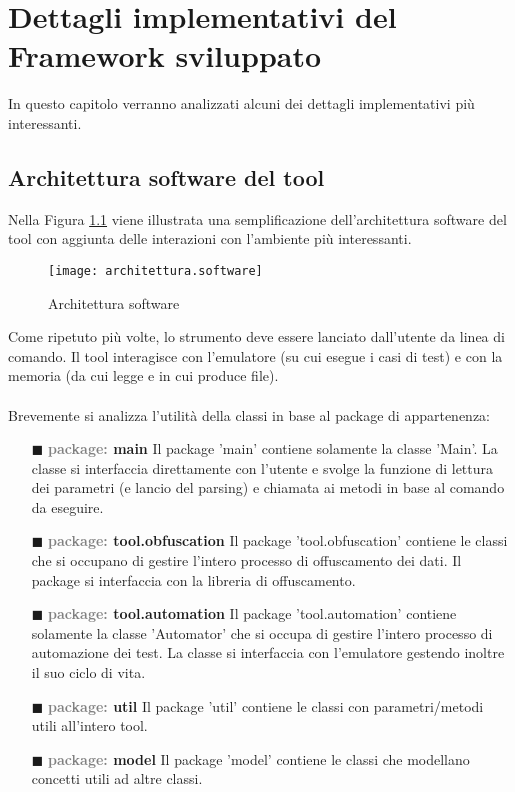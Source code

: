 
\chapter{Dettagli implementativi del Framework sviluppato}
\label{cap:dettagli}
In questo capitolo verranno analizzati alcuni dei dettagli implementativi più interessanti.
\rhead{}
\section{Architettura software del tool}
Nella Figura \ref{fig:arch.soft} viene illustrata una semplificazione dell'architettura software del tool con aggiunta delle interazioni con l'ambiente più interessanti.
\begin{figure}[H]
	\texttt{[image: architettura.software]}
	\centering
	\caption{Architettura software}
    \label{fig:arch.soft}
\end{figure}

\noindent Come ripetuto più volte, lo strumento deve essere lanciato dall'utente da linea di comando. Il tool interagisce con l'emulatore (su cui esegue i casi di test) e con la memoria (da cui legge e in cui produce file). \\\\ \noindent Brevemente si analizza l'utilità della classi in base al package di appartenenza:


\begin{itemize} [nosep]
\item [$\blacksquare$]  \textbf{\textcolor{gray}{package: }main} \newline
Il package 'main' contiene solamente la classe 'Main'. La classe si interfaccia direttamente con l'utente e svolge la funzione di lettura dei parametri (e lancio del parsing) e chiamata ai metodi in base al comando da eseguire.
\item [$\blacksquare$]  \textbf{\textcolor{gray}{package: }tool.obfuscation} \newline
Il package 'tool.obfuscation' contiene le classi che si occupano di gestire l'intero processo di offuscamento dei dati. Il package si interfaccia con la libreria di offuscamento. 
\item [$\blacksquare$]  \textbf{\textcolor{gray}{package: }tool.automation} \newline
Il package 'tool.automation' contiene solamente la classe 'Automator' che si occupa di gestire l'intero processo di automazione dei test. La classe si interfaccia con l'emulatore gestendo inoltre il suo ciclo di vita.
\item [$\blacksquare$]  \textbf{\textcolor{gray}{package: }util} \newline
Il package 'util' contiene le classi con parametri/metodi utili all'intero tool.
\item [$\blacksquare$]  \textbf{\textcolor{gray}{package: }model} \newline
Il package 'model' contiene le classi che modellano concetti utili ad altre classi.
\end{itemize}

